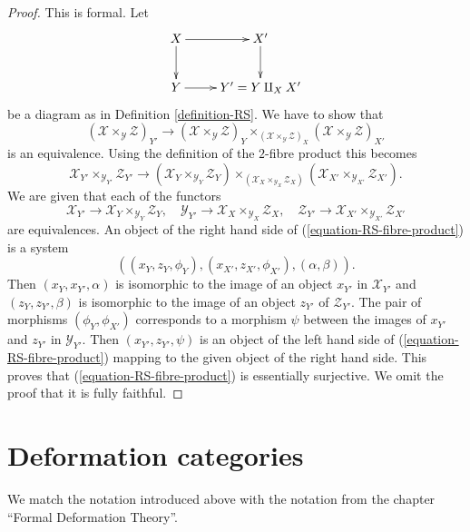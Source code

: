 \documentclass{stacks-project}
\theoremstyle{plain}
\theoremstyle{definition}
\theoremstyle{remark}
\numberwithin{equation}{subsection}
\begin{document}
\begin{proof}
This is formal. Let 
$$
\xymatrix{
X \ar[r] \ar[d] & X' \ar[d] \\
Y \ar[r] & Y' = Y \amalg_X X'
}
$$
be a diagram as in Definition \ref{definition-RS}. We have to show that
$$
(\mathcal{X} \times_{\mathcal{Y}} \mathcal{Z})_{Y'}
\longrightarrow
(\mathcal{X} \times_{\mathcal{Y}} \mathcal{Z})_Y
\times_{(\mathcal{X} \times_{\mathcal{Y}} \mathcal{Z})_X}
(\mathcal{X} \times_{\mathcal{Y}} \mathcal{Z})_{X'}
$$
is an equivalence. Using the definition of the $2$-fibre product
this becomes
\begin{equation}
\label{equation-RS-fibre-product}
\mathcal{X}_{Y'} \times_{\mathcal{Y}_{Y'}} \mathcal{Z}_{Y'}
\longrightarrow
(\mathcal{X}_Y \times_{\mathcal{Y}_Y} \mathcal{Z}_Y)
\times_{(\mathcal{X}_X \times_{\mathcal{Y}_X} \mathcal{Z}_X)}
(\mathcal{X}_{X'} \times_{\mathcal{Y}_{X'}} \mathcal{Z}_{X'}).
\end{equation}
We are given that each of the functors
$$
\mathcal{X}_{Y'} \to \mathcal{X}_Y \times_{\mathcal{Y}_Y} \mathcal{Z}_Y,
\quad
\mathcal{Y}_{Y'} \to \mathcal{X}_X \times_{\mathcal{Y}_X} \mathcal{Z}_X,
\quad
\mathcal{Z}_{Y'} \to
\mathcal{X}_{X'} \times_{\mathcal{Y}_{X'}} \mathcal{Z}_{X'}
$$
are equivalences. An object of the right hand side of
(\ref{equation-RS-fibre-product}) is a system
$$
((x_Y, z_Y, \phi_Y), (x_{X'}, z_{X'}, \phi_{X'}), (\alpha, \beta)).
$$
Then $(x_Y, x_{Y'}, \alpha)$ is isomorphic to the image of an object
$x_{Y'}$ in $\mathcal{X}_{Y'}$ and $(z_Y, z_{Y'}, \beta)$ is isomorphic
to the image of an object $z_{Y'}$ of $\mathcal{Z}_{Y'}$. The pair of
morphisms $(\phi_Y, \phi_{X'})$ corresponds to a morphism $\psi$
between the images of $x_{Y'}$ and $z_{Y'}$ in $\mathcal{Y}_{Y'}$.
Then $(x_{Y'}, z_{Y'}, \psi)$ is an object of the left hand side of
(\ref{equation-RS-fibre-product}) mapping to the given object of the
right hand side. This proves that (\ref{equation-RS-fibre-product}) is
essentially surjective. We omit the proof that it is fully faithful.
\end{proof}





\section{Deformation categories}
\label{section-deformation-categories}

\noindent
We match the notation introduced above with the notation from the
chapter ``Formal Deformation Theory''.
\end{document}
